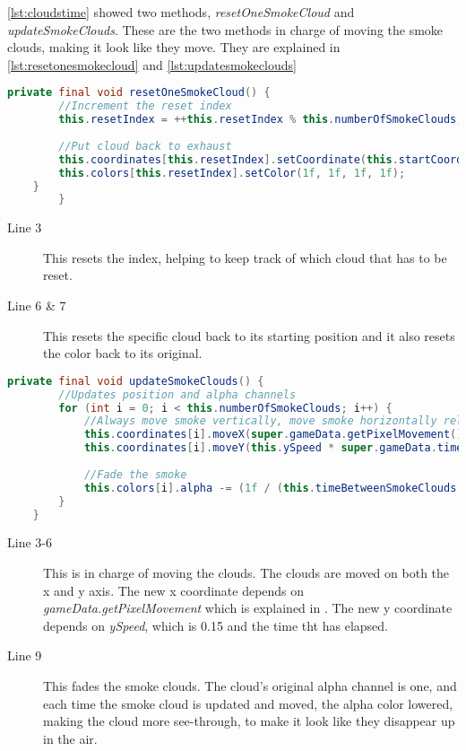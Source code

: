 \autoref{lst:cloudstime} showed two methods, \textit{resetOneSmokeCloud} and \textit{updateSmokeClouds}. These are the two methods in charge of moving the smoke clouds, making it look like they move. They are explained in \autoref{lst:resetonesmokecloud} and \autoref{lst:updatesmokeclouds}

\begin{lstlisting}[language=java,firstnumber=1,caption={Smoke clouds getting reset based on time intervals},label=lst:resetonesmokecloud]
    private final void resetOneSmokeCloud() {
        //Increment the reset index
        this.resetIndex = ++this.resetIndex % this.numberOfSmokeClouds;
        
        //Put cloud back to exhaust
        this.coordinates[this.resetIndex].setCoordinate(this.startCoordinate.getX(), this.startCoordinate.getY());
        this.colors[this.resetIndex].setColor(1f, 1f, 1f, 1f);
    }
        }
\end{lstlisting}

\begin{description}
\item[Line 3] This resets the index, helping to keep track of which cloud that has to be reset. 
\item[Line 6 \& 7] This resets the specific cloud back to its starting position and it also resets the color back to its original. 
\end{description}
 
\begin{lstlisting}[language=java,firstnumber=1,caption={Smoke clouds getting reset based on time intervals},label=lst:updatesmokeclouds]
    private final void updateSmokeClouds() {
        //Updates position and alpha channels
        for (int i = 0; i < this.numberOfSmokeClouds; i++) {
            //Always move smoke vertically, move smoke horizontally relative to the train speed.
            this.coordinates[i].moveX(super.gameData.getPixelMovement());
            this.coordinates[i].moveY(this.ySpeed * super.gameData.timeDifference);
            
            //Fade the smoke
            this.colors[i].alpha -= (1f / (this.timeBetweenSmokeClouds * this.numberOfSmokeClouds)) * super.gameData.timeDifference;
        }
    }
\end{lstlisting}

\begin{description}
\item[Line 3-6] This is in charge of moving the clouds. The clouds are moved on both the x and y axis. The new x coordinate depends on \textit{gameData.getPixelMovement} which is explained in . The new y coordinate depends on \textit{ySpeed}, which is 0.15  and the time tht has elapsed.
\item[Line 9] This fades the smoke clouds. The cloud's original alpha channel is one, and each time the smoke cloud is updated and moved, the alpha color lowered, making the cloud more see-through, to make it look like they disappear up in the air. 
\end{description}

